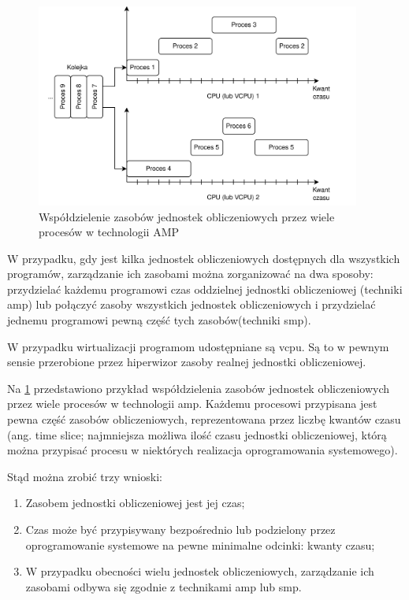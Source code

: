 \documentclass[../main]{subfiles}
\begin{document}
\begin{figure}[ht]
    \centering
    \includegraphics[width=0.95\textwidth]{Images/time-sharing.png}
    \caption{Współdzielenie zasobów jednostek obliczeniowych przez wiele procesów w technologii AMP}
    \label{fig:time-sharing}
\end{figure}

W przypadku, gdy jest kilka jednostek obliczeniowych dostępnych dla wszystkich programów, zarządzanie ich zasobami można zorganizować na dwa sposoby: przydzielać każdemu programowi czas oddzielnej jednostki obliczeniowej (techniki \gls{amp}) lub połączyć zasoby wszystkich jednostek obliczeniowych i przydzielać jednemu programowi pewną część  tych zasobów(techniki \gls{smp}).

W przypadku wirtualizacji programom udostępniane są \gls{vcpu}. Są to w pewnym sensie przerobione przez hiperwizor zasoby realnej jednostki obliczeniowej.

Na \cref{fig:time-sharing} przedstawiono przykład współdzielenia zasobów jednostek obliczeniowych przez wiele procesów w technologii \gls{amp}. Każdemu procesowi przypisana jest pewna część zasobów obliczeniowych, reprezentowana przez liczbę kwantów czasu (ang. time slice; najmniejsza możliwa ilość czasu jednostki obliczeniowej, którą można przypisać procesu w niektórych realizacja oprogramowania systemowego).

Stąd można zrobić trzy wnioski:

\begin{enumerate}
    \item Zasobem jednostki obliczeniowej jest jej czas;
    \item Czas może być przypisywany bezpośrednio lub podzielony przez oprogramowanie systemowe na pewne minimalne odcinki: kwanty czasu;
    \item W przypadku obecności wielu jednostek obliczeniowych, zarządzanie ich zasobami odbywa się zgodnie z technikami \gls{amp} lub \gls{smp}.
\end{enumerate}
\end{document}
